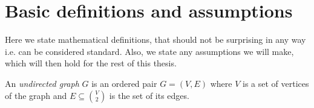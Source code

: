 
\section{Basic definitions and assumptions}

Here we state mathematical definitions, that should not be surprising in any way i.e. can be considered standard. Also, we state any assumptions we will make, which will then hold for the rest of this thesis.

\begin{definition}
    An \textit{undirected graph} $G$ is an ordered pair $G=(V,E)$ where $V$ is a set of vertices of the graph and $E \subseteq \binom{V}{2}$ is the set of its edges. 
\end{definition}

